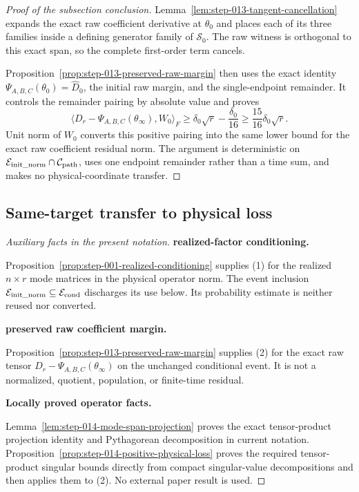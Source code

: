 \begin{proof}[Proof of the subsection conclusion]

Lemma~\ref{lem:step-013-tangent-cancellation} expands the exact raw
coefficient derivative at \(\theta_0\) and places each of its three families
inside a defining generator family of \(\mathscr S_0\). The raw
witness is orthogonal to this exact span, so the complete first-order term
cancels.

Proposition~\ref{prop:step-013-preserved-raw-margin} then uses the exact
identity \(\Psi_{A,B,C}(\theta_0)=\widehat D_0\), the initial raw
margin, and the single-endpoint remainder. It controls the remainder
pairing by absolute value and proves
\[
  \langle D_r-\Psi_{A,B,C}(\theta_\infty),W_0\rangle_F
  \ge\delta_0\sqrt r-\frac{\delta_0}{16}
  \ge\frac{15}{16}\delta_0\sqrt r.
\]
Unit norm of \(W_0\) converts this positive pairing into the same lower bound
for the exact raw coefficient residual norm. The argument is deterministic
on \(\mathcal E_{\rm init\_norm}\cap\mathcal C_{\rm path}\), uses one endpoint
remainder rather than a time sum, and makes no physical-coordinate transfer.

\end{proof}

\subsection{Same-target transfer to physical loss}\label{app:step-014}

\begin{proof}[Auxiliary facts in the present notation]


\medskip\noindent\textbf{realized-factor conditioning.}\par

Proposition~\ref{prop:step-001-realized-conditioning} supplies (1)
for the realized \(n\times r\) mode matrices in the physical operator norm.
The event inclusion
\(\mathcal E_{\rm init\_norm}\subseteq\mathcal E_{\rm cond}\) discharges its
use below. Its probability estimate is neither reused nor converted.


\medskip\noindent\textbf{preserved raw coefficient margin.}\par

Proposition~\ref{prop:step-013-preserved-raw-margin} supplies (2)
for the exact raw tensor \(D_r-\Psi_{A,B,C}(\theta_\infty)\) on the unchanged
conditional event. It is not a normalized, quotient, population, or
finite-time residual.


\medskip\noindent\textbf{Locally proved operator facts.}\par

Lemma~\ref{lem:step-014-mode-span-projection} proves the exact tensor-product
projection identity and Pythagorean decomposition in current notation.
Proposition~\ref{prop:step-014-positive-physical-loss} proves the required
tensor-product singular bounds directly from compact singular-value
decompositions and then applies them to (2). No external paper result is used.

\end{proof}




